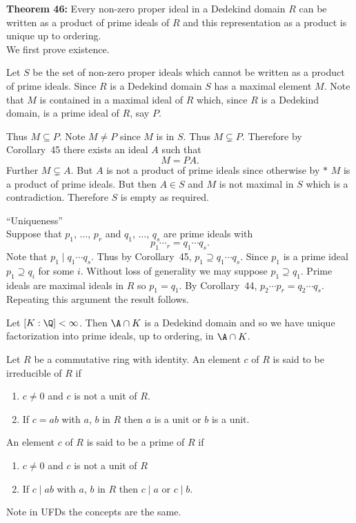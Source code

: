\textbf{Theorem 46:} Every non-zero proper ideal in a Dedekind domain $R$ can be written as a product of prime ideals of $R$ and this representation as a product is unique up to ordering. \\
\pf We first prove existence.

Let $S$ be the set of non-zero proper ideals which cannot be written as a product of prime ideals.  Since $R$ is a Dedekind domain $S$ has a maximal element $M$.  Note that $M$ is contained in a maximal ideal of $R$ which, since $R$ is a Dedekind domain, is a prime ideal of $R$, say $P$.

Thus $M\subseteq P$.  Note $M\neq P$ since $M$ is in $S$.  Thus $M\subsetneq P$.  Therefore by Corollary~45 there exists an ideal $A$ such that
\[ M = PA . \]
Further $M\subsetneq A$.  But $A$ is not a product of prime ideals since otherwise by $*$ $M$ is a product of prime ideals.  But then $A\in S$ and $M$ is not maximal in $S$ which is a contradiction.  Therefore $S$ is empty as required.

``Uniqueness'' \\
Suppose that $p_1$, $\dotsc$, $p_r$ and $q_1$, $\dotsc$, $q_s$ are prime ideals with
\[ p_1\dotsm _r = q_1\dotsm q_s . \]
Note that $p_1\mid q_1\dotsm q_s$.  Thus by Corollary~45, $p_1\supseteq q_1\dotsm q_s$.  Since $p_1$ is a prime ideal $p_1\supseteq q_i$ for some $i$.  Without loss of generality we may suppose $p_1\supseteq q_1$.  Prime ideals are maximal ideals in $R$ so $p_1=q_1$.  By Corollary~44, $p_2\dotsm p_r=q_2\dotsm q_s$.  Repeating this argument the result follows.

\remark Let $[K:\Q]<\infty$.  Then $\A\cap K$ is a Dedekind domain and so we have unique factorization into prime ideals, up to ordering, in $\A\cap K$.

 Let $R$ be a commutative ring with identity.  An element $c$ of $R$ is said to be irreducible of $R$ if
\begin{enumerate}
\item $c\neq0$ and $c$ is not a unit of $R$.
\item If $c=ab$ with $a$, $b$ in $R$ then $a$ is a unit or $b$ is a unit.
\end{enumerate}
An element $c$ of $R$ is said to be a prime of $R$ if
\begin{enumerate}
\item $c\neq0$ and $c$ is not a unit of $R$
\item If $c\mid ab$ with $a$, $b$ in $R$ then $c\mid a$ or $c\mid b$.
\end{enumerate}
Note in UFDs the concepts are the same.